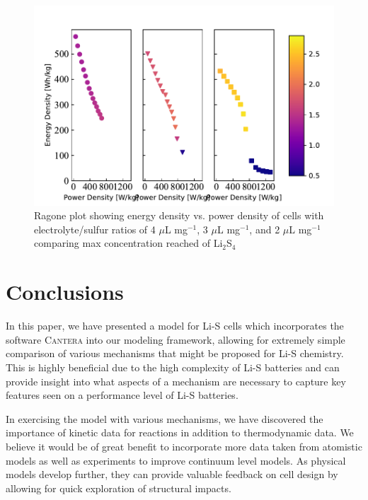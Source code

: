 \documentclass{elsarticle}
\begin{document}
\begin{figure}
    \centering
    \includegraphics[width=\textwidth]{Figures/Ragone_ES_ratio_Li2S4.pdf}
    \caption{Ragone plot showing energy density vs. power density of cells with electrolyte/sulfur ratios of 4 $\mu$L mg$^{-1}$, 3 $\mu$L mg$^{-1}$, and 2 $\mu$L mg$^{-1}$ comparing max concentration reached of Li$_2$S$_4$}
    \label{fig:ragoneLi2S4}
\end{figure}


\section{Conclusions}

In this paper, we have presented a model for Li-S cells which incorporates the software \textsc{Cantera} into our modeling framework, allowing for extremely simple comparison of various mechanisms that might be proposed for Li-S chemistry. This is highly beneficial due to the high complexity of Li-S batteries and can provide insight into what aspects of a mechanism are necessary to capture key features seen on a performance level of Li-S batteries. 

In exercising the model with various mechanisms, we have discovered the importance of kinetic data for reactions in addition to thermodynamic data. We believe it would be of great benefit to incorporate more data taken from atomistic models as well as experiments to improve continuum level models. As physical models develop further, they can provide valuable feedback on cell design by allowing for quick exploration of structural impacts.


\newpage

\newpage
\end{document}

